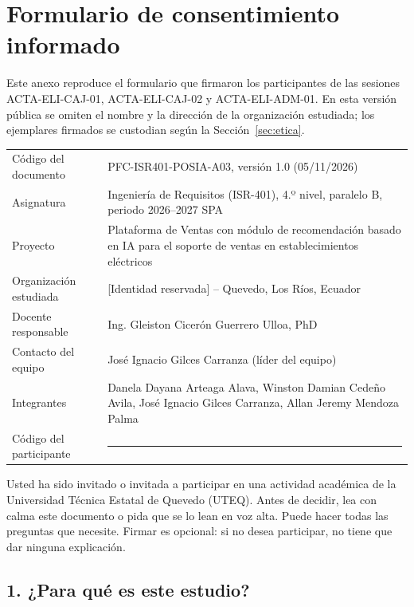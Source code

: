 \section{Formulario de consentimiento informado}\label{anx:consentimiento}

Este anexo reproduce el formulario que firmaron los participantes de las sesiones ACTA-ELI-CAJ-01, ACTA-ELI-CAJ-02 y ACTA-ELI-ADM-01. En esta versión pública se omiten el nombre y la dirección de la organización estudiada; los ejemplares firmados se custodian según la Sección~\ref{sec:etica}.

\begin{center}
\small
\begin{tabularx}{\textwidth}{@{}L{4.2cm}X@{}}
\toprule
Código del documento & PFC-ISR401-POSIA-A03, versión 1.0 (05/11/2026) \\
Asignatura & Ingeniería de Requisitos (ISR-401), 4.º nivel, paralelo B, periodo 2026--2027 SPA \\
Proyecto & Plataforma de Ventas con módulo de recomendación basado en IA para el soporte de ventas en establecimientos eléctricos \\
Organización estudiada & [Identidad reservada] -- Quevedo, Los Ríos, Ecuador \\
Docente responsable & Ing. Gleiston Cicerón Guerrero Ulloa, PhD \\
Contacto del equipo & José Ignacio Gilces Carranza (líder del equipo) \\
Integrantes & Danela Dayana Arteaga Alava, Winston Damian Cedeño Avila, José Ignacio Gilces Carranza, Allan Jeremy Mendoza Palma \\
Código del participante & \rule{4.2cm}{0.4pt} \\
\bottomrule
\end{tabularx}
\end{center}

Usted ha sido invitado o invitada a participar en una actividad académica de la Universidad Técnica Estatal de Quevedo (UTEQ). Antes de decidir, lea con calma este documento o pida que se lo lean en voz alta. Puede hacer todas las preguntas que necesite. Firmar es opcional: si no desea participar, no tiene que dar ninguna explicación.

\subsection*{1. ¿Para qué es este estudio?}

